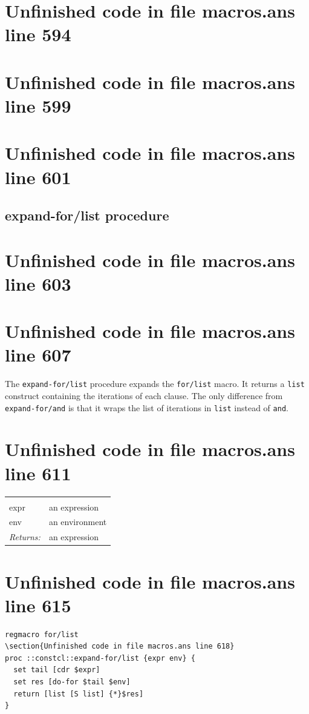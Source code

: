 \documentclass[twoside,9pt]{report}
\begin{document}
\section{Unfinished code in file macros.ans line 594}
\section{Unfinished code in file macros.ans line 599}
\section{Unfinished code in file macros.ans line 601}
\subsection{expand-for/list procedure}
\label{expand-for/list-procedure}
\section{Unfinished code in file macros.ans line 603}

\section{Unfinished code in file macros.ans line 607}

The \texttt{expand-for/list} procedure expands the \texttt{for/list} macro. It returns a \texttt{list} construct containing the iterations of each clause. The only difference from \texttt{expand-for/and} is that it wraps the list of iterations in \texttt{list} instead of \texttt{and}.

\section{Unfinished code in file macros.ans line 611}
\noindent\begin{tabular}{ |p{1.9cm} p{8cm}| }
\hline
\rowcolor[HTML]{CCCCCC} \multicolumn{2}{|l|}{\bf expand for/list (internal)} \\
expr & an expression \\
env & an environment \\
\textit{Returns:} & an expression \\
\hline
\end{tabular}
\section{Unfinished code in file macros.ans line 615}
\begin{lstlisting}
regmacro for/list
\section{Unfinished code in file macros.ans line 618}
proc ::constcl::expand-for/list {expr env} {
  set tail [cdr $expr]
  set res [do-for $tail $env]
  return [list [S list] {*}$res]
}
\end{lstlisting}
\end{document}
